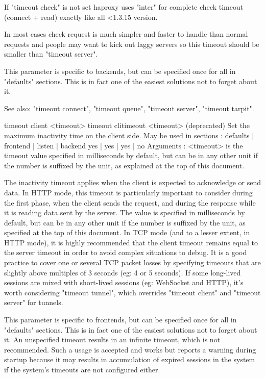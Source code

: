   If "timeout check" is not set haproxy uses "inter" for complete check
  timeout (connect + read) exactly like all <1.3.15 version.

  In most cases check request is much simpler and faster to handle than normal
  requests and people may want to kick out laggy servers so this timeout should
  be smaller than "timeout server".

  This parameter is specific to backends, but can be specified once for all in
  "defaults" sections. This is in fact one of the easiest solutions not to
  forget about it.

  See also: "timeout connect", "timeout queue", "timeout server",
            "timeout tarpit".


timeout client <timeout>
timeout clitimeout <timeout> (deprecated)
  Set the maximum inactivity time on the client side.
  May be used in sections :   defaults | frontend | listen | backend
                                 yes   |    yes   |   yes  |   no
  Arguments :
    <timeout> is the timeout value specified in milliseconds by default, but
              can be in any other unit if the number is suffixed by the unit,
              as explained at the top of this document.

  The inactivity timeout applies when the client is expected to acknowledge or
  send data. In HTTP mode, this timeout is particularly important to consider
  during the first phase, when the client sends the request, and during the
  response while it is reading data sent by the server. The value is specified
  in milliseconds by default, but can be in any other unit if the number is
  suffixed by the unit, as specified at the top of this document. In TCP mode
  (and to a lesser extent, in HTTP mode), it is highly recommended that the
  client timeout remains equal to the server timeout in order to avoid complex
  situations to debug. It is a good practice to cover one or several TCP packet
  losses by specifying timeouts that are slightly above multiples of 3 seconds
  (eg: 4 or 5 seconds). If some long-lived sessions are mixed with short-lived
  sessions (eg: WebSocket and HTTP), it's worth considering "timeout tunnel",
  which overrides "timeout client" and "timeout server" for tunnels.

  This parameter is specific to frontends, but can be specified once for all in
  "defaults" sections. This is in fact one of the easiest solutions not to
  forget about it. An unspecified timeout results in an infinite timeout, which
  is not recommended. Such a usage is accepted and works but reports a warning
  during startup because it may results in accumulation of expired sessions in
  the system if the system's timeouts are not configured either.

